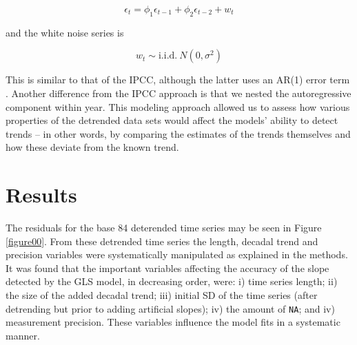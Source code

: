 \documentclass[]{ametsoc}
\begin{document}
$$\epsilon_{t} = \phi_{1}\epsilon_{t-1} + \phi_{2}\epsilon_{t-2} + w_{t}$$

and the white noise series is

$$w_{t} \sim \mathrm{i.i.d.}~N(0,\sigma^{2})$$

This is similar to that of the IPCC, although the latter uses an AR(1) error term \citep{IPCC2013supp}. Another difference from the IPCC approach is that we nested the autoregressive component within year. This modeling approach allowed us to assess how various properties of the detrended data sets would affect the models' ability to detect trends -- in other words, by comparing the estimates of the trends themselves and how these deviate from the known trend.

\section{Results}
The residuals for the base 84 deterended time series may be seen in Figure \ref{figure00}. From these detrended time series the length, decadal trend and precision variables were systematically manipulated as explained in the methods. It was found that the important variables affecting the accuracy of the slope detected by the GLS model, in decreasing order, were: i) time series length; ii) the size of the added decadal trend; iii) initial SD of the time series (after detrending but prior to adding artificial slopes); iv) the amount of \texttt{NA}; and iv) measurement precision. These variables influence the model fits in a systematic manner.
\end{document}
